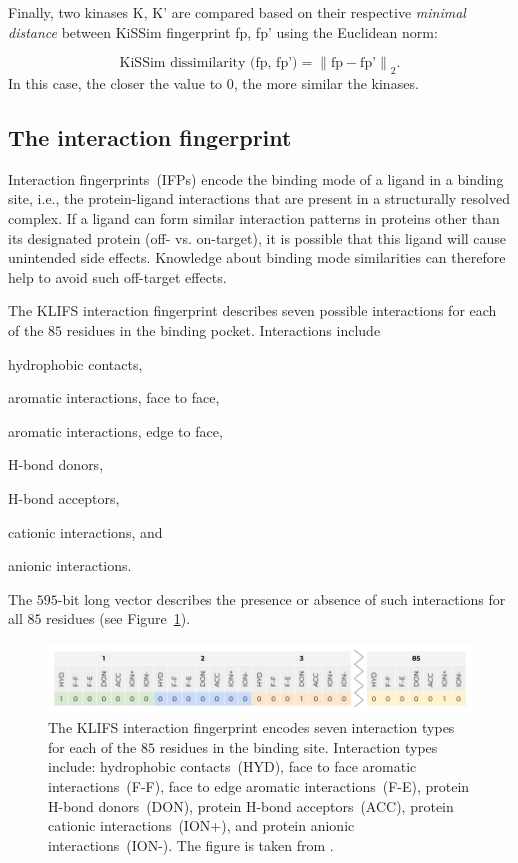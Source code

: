 \documentclass[9pt,training,ASAPversion]{livecoms}
\newcommand{\kinA}{K}
\newcommand{\kinB}{K'}
\begin{document}
Finally, two kinases \kinA{}, \kinB{} are compared based on their respective \textit{minimal distance} between KiSSim fingerprint fp, fp' using the Euclidean norm:

\begin{equation}
    \text{KiSSim dissimilarity (fp, fp')} = \left\lVert\text{fp} - \text{fp'}\right\rVert_2.
\end{equation}
In this case, the closer the value to $0$, the more similar the kinases.

\subsection{The interaction fingerprint}
Interaction fingerprints~(IFPs) encode the binding mode of a ligand in a binding site, i.e., the protein-ligand interactions that are present in a structurally resolved complex. If a ligand can form similar interaction patterns in proteins other than its designated protein (off- vs. on-target), it is possible that this ligand will cause unintended side effects. Knowledge about binding mode similarities can therefore help to avoid such off-target effects.

The KLIFS interaction fingerprint describes seven possible interactions for each of the $85$ residues in the binding pocket. Interactions include
\begin{enumerate*}
    \item hydrophobic contacts,
    \item aromatic interactions, face to face,
    \item aromatic interactions, edge to face,
    \item H-bond donors,
    \item H-bond acceptors,
    \item cationic interactions, and
    \item anionic interactions. 
\end{enumerate*}
The $595$-bit long vector describes the presence or absence of such interactions for all $85$ residues (see Figure~\ref{fig:ifp_similarity}).

\begin{figure}[ht]
    \centering
    \includegraphics[width=\columnwidth]{IFP.png}
    \caption{The KLIFS interaction fingerprint encodes seven interaction types for each of the $85$ residues in the binding site. Interaction types include: hydrophobic contacts~(HYD), face to face aromatic interactions~(F-F), face to edge aromatic interactions~(F-E), protein H-bond donors~(DON), protein H-bond acceptors~(ACC), protein cationic interactions~(ION+), and protein anionic interactions~(ION-). The figure is taken from \cite{toc_website}.}
    \label{fig:ifp_similarity}
\end{figure}
\end{document}
